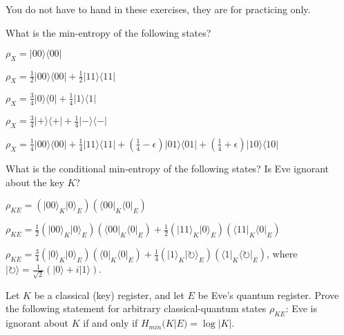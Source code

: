 \documentclass[a4paper,10pt,landscape,twocolumn]{scrartcl}
\newcommand{\ket}[1]{\lvert #1 \rangle}
\newcommand{\bra}[1]{\langle #1 \rvert}
\begin{document}
\practiceproblems

{\sffamily\noindent
You do not have to hand in these exercises, they are for practicing only. %
}

\begin{exercise}
What is the min-entropy of the following states?
\begin{subex}
$\rho_X = \ket{00}\bra{00}$
\end{subex}
\begin{subex}
$\rho_X = \frac{1}{2} \ket{00}\bra{00} + \frac{1}{2} \ket{11}\bra{11}$
\end{subex}
\begin{subex}
$\rho_X = \frac{3}{4} \ket{0}\bra{0} + \frac{1}{4} \ket{1}\bra{1}$
\end{subex}
\begin{subex}
$\rho_X = \frac{3}{4} \ket{+}\bra{+} + \frac{1}{4} \ket{-}\bra{-}$
\end{subex}
\begin{subex}
$\rho_X = \frac{1}{4} \ket{00}\bra{00} + \frac{1}{4} \ket{11}\bra{11} + \left(\frac{1}{4} - \epsilon\right) \ket{01}\bra{01} + \left(\frac{1}{4}+\epsilon\right) \ket{10}\bra{10}$
\end{subex}
\noindent What is the conditional min-entropy of the following states? Is Eve ignorant about the key $K$?
\begin{subex}
$\rho_{KE} = (\ket{00}_K \ket0_E)(\bra{00}_K\bra0_E)$
\end{subex}
\begin{subex}
$\rho_{KE} = \frac{1}{2}(\ket{00}_K \ket0_E)(\bra{00}_K\bra0_E) + \frac{1}{2}(\ket{11}_K \ket0_E)(\bra{11}_K\bra0_E)$
\end{subex}
\begin{subex}
$\rho_{KE} = \frac{3}{4} (\ket{0}_K\ket0_E)(\bra{0}_K\bra0_E) + \frac{1}{4} (\ket{1}_K\ket{\circlearrowright}_E)(\bra{1}_K\bra\circlearrowright_E)$, where $\ket{\circlearrowright} = \frac{1}{\sqrt{2}}(\ket0 + i \ket1)$.
\end{subex}
\begin{subex}
	Let $K$ be a classical (key) register, and let $E$ be Eve's quantum register. Prove the following statement for arbitrary classical-quantum states $\rho_{KE}$: Eve is ignorant about $K$ if and only if $H_{min}(K|E) = \log|K|$.
\end{subex}
\end{exercise}
\end{document}
